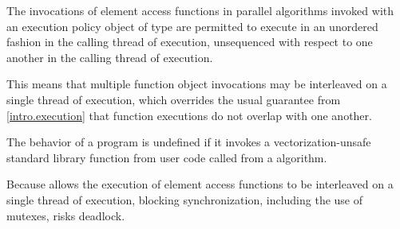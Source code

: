 \pnum
The invocations of element access functions in parallel algorithms invoked with
an execution policy object of type 
are permitted to execute in an unordered fashion
in the calling thread of execution,
unsequenced with respect to one another in the calling thread of execution.
\begin{note}
This means that multiple function object invocations
may be interleaved on a single thread of execution,
which overrides the usual guarantee from \ref{intro.execution}
that function executions do not overlap with one another.
\end{note}
The behavior of a program is undefined if
it invokes a vectorization-unsafe standard library function
from user code
called from a  algorithm.
\begin{note}
Because  allows
the execution of element access functions
to be interleaved on a single thread of execution,
blocking synchronization, including the use of mutexes, risks deadlock.
\end{note}

